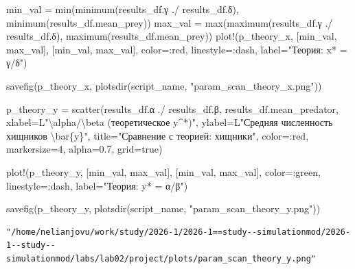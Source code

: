 \documentclass[
  12pt,
  a4paper,
  DIV=11,
  numbers=noendperiod]{scrreprt}
\newenvironment{Shaded}{\begin{snugshade}}{\end{snugshade}}
\newcommand{\ConstantTok}[1]{\textcolor[rgb]{0.56,0.35,0.01}{#1}}
\newcommand{\FloatTok}[1]{\textcolor[rgb]{0.68,0.00,0.00}{#1}}
\newcommand{\FunctionTok}[1]{\textcolor[rgb]{0.28,0.35,0.67}{#1}}
\newcommand{\NormalTok}[1]{\textcolor[rgb]{0.00,0.23,0.31}{#1}}
\newcommand{\OperatorTok}[1]{\textcolor[rgb]{0.37,0.37,0.37}{#1}}
\newcommand{\SpecialCharTok}[1]{\textcolor[rgb]{0.37,0.37,0.37}{#1}}
\newcommand{\StringTok}[1]{\textcolor[rgb]{0.13,0.47,0.30}{#1}}
\begin{document}
\begin{Shaded}
\begin{Highlighting}[]
\NormalTok{min\_val }\OperatorTok{=} \FunctionTok{min}\NormalTok{(}\FunctionTok{minimum}\NormalTok{(results\_df.γ }\OperatorTok{./}\NormalTok{ results\_df.δ), }\FunctionTok{minimum}\NormalTok{(results\_df.mean\_prey))}
\NormalTok{max\_val }\OperatorTok{=} \FunctionTok{max}\NormalTok{(}\FunctionTok{maximum}\NormalTok{(results\_df.γ }\OperatorTok{./}\NormalTok{ results\_df.δ), }\FunctionTok{maximum}\NormalTok{(results\_df.mean\_prey))}
\FunctionTok{plot!}\NormalTok{(p\_theory\_x, [min\_val, max\_val], [min\_val, max\_val],}
\NormalTok{    color}\OperatorTok{=:}\NormalTok{red, linestyle}\OperatorTok{=:}\NormalTok{dash, label}\OperatorTok{=}\StringTok{"Теория: x* = γ/δ"}\NormalTok{)}

\FunctionTok{savefig}\NormalTok{(p\_theory\_x, }\FunctionTok{plotsdir}\NormalTok{(script\_name, }\StringTok{"param\_scan\_theory\_x.png"}\NormalTok{))}

\NormalTok{p\_theory\_y }\OperatorTok{=} \FunctionTok{scatter}\NormalTok{(results\_df.α }\OperatorTok{./}\NormalTok{ results\_df.β, results\_df.mean\_predator,}
\NormalTok{    xlabel}\OperatorTok{=}\NormalTok{L}\StringTok{"}\SpecialCharTok{\textbackslash{}a}\StringTok{lpha/}\SpecialCharTok{\textbackslash{}b}\StringTok{eta (теоретическое y\^{}*)"}\NormalTok{,}
\NormalTok{    ylabel}\OperatorTok{=}\NormalTok{L}\StringTok{"Средняя численность хищников }\SpecialCharTok{\textbackslash{}b}\StringTok{ar\{y\}"}\NormalTok{,}
\NormalTok{    title}\OperatorTok{=}\StringTok{"Сравнение с теорией: хищники"}\NormalTok{,}
\NormalTok{    color}\OperatorTok{=:}\NormalTok{red,}
\NormalTok{    markersize}\OperatorTok{=}\FloatTok{4}\NormalTok{,}
\NormalTok{    alpha}\OperatorTok{=}\FloatTok{0.7}\NormalTok{,}
\NormalTok{    grid}\OperatorTok{=}\ConstantTok{true}\NormalTok{)}

\FunctionTok{plot!}\NormalTok{(p\_theory\_y, [min\_val, max\_val], [min\_val, max\_val],}
\NormalTok{    color}\OperatorTok{=:}\NormalTok{green, linestyle}\OperatorTok{=:}\NormalTok{dash, label}\OperatorTok{=}\StringTok{"Теория: y* = α/β"}\NormalTok{)}

\FunctionTok{savefig}\NormalTok{(p\_theory\_y, }\FunctionTok{plotsdir}\NormalTok{(script\_name, }\StringTok{"param\_scan\_theory\_y.png"}\NormalTok{))}
\end{Highlighting}
\end{Shaded}

\begin{verbatim}
"/home/nelianjovu/work/study/2026-1/2026-1==study--simulationmod/2026-1--study--simulationmod/labs/lab02/project/plots/param_scan_theory_y.png"
\end{verbatim}
\end{document}
